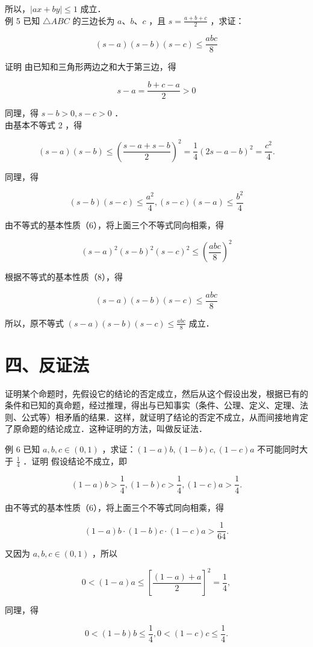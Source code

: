 \documentclass[10pt]{article}
\begin{document}
所以，\(|a x+b y| \leqslant 1\) 成立．\\
例 5 已知 \(\triangle A B C\) 的三边长为 \(a 、 b 、 c\) ，且 \(s=\frac{a+b+c}{2}\) ，求证：

\[
(s-a)(s-b)(s-c) \leqslant \frac{a b c}{8}
\]

证明 由已知和三角形两边之和大于第三边，得

\[
s-a=\frac{b+c-a}{2}>0
\]

同理，得 \(s-b>0, s-c>0\) ．\\
由基本不等式 2 ，得

\[
(s-a)(s-b) \leqslant\left(\frac{s-a+s-b}{2}\right)^{2}=\frac{1}{4}(2 s-a-b)^{2}=\frac{c^{2}}{4} .
\]

同理，得

\[
(s-b)(s-c) \leqslant \frac{a^{2}}{4},(s-c)(s-a) \leqslant \frac{b^{2}}{4}
\]

由不等式的基本性质（6），将上面三个不等式同向相乘，得

\[
(s-a)^{2}(s-b)^{2}(s-c)^{2} \leqslant\left(\frac{a b c}{8}\right)^{2}
\]

根据不等式的基本性质（8），得

\[
(s-a)(s-b)(s-c) \leqslant \frac{a b c}{8}
\]

所以，原不等式 \((s-a)(s-b)(s-c) \leqslant \frac{a b c}{8}\) 成立．

\section*{四、反证法}
证明某个命题时，先假设它的结论的否定成立，然后从这个假设出发，根据已有的条件和已知的真命题，经过推理，得出与已知事实（条件、公理、定义、定理、法则、公式等）相矛盾的结果．这样，就证明了结论的否定不成立，从而间接地肯定了原命题的结论成立．这种证明的方法，叫做反证法．

例 6 已知 \(a, b, c \in(0,1)\) ，求证：\((1-a) b,(1-b) c,(1-c) a\) 不可能同时大于 \(\frac{1}{4}\) ．证明 假设结论不成立，即

\[
(1-a) b>\frac{1}{4},(1-b) c>\frac{1}{4},(1-c) a>\frac{1}{4} .
\]

由不等式的基本性质（6），将上面三个不等式同向相乘，得

\[
(1-a) b \cdot(1-b) c \cdot(1-c) a>\frac{1}{64} .
\]

又因为 \(a, b, c \in(0,1)\) ，所以

\[
0<(1-a) a \leqslant\left[\frac{(1-a)+a}{2}\right]^{2}=\frac{1}{4},
\]

同理，得

\[
0<(1-b) b \leqslant \frac{1}{4}, 0<(1-c) c \leqslant \frac{1}{4} .
\]
\end{document}
